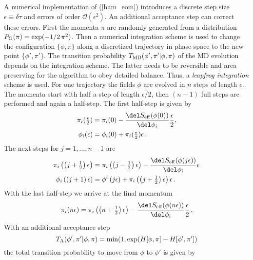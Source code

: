 A numerical implementation of (\ref{ham_eom}) introduces a discrete step size $\epsilon \equiv \delta	\tau$ and errors of order $\mathcal{O}(\epsilon^{2})$. An additional  acceptance step can correct these errors. First the momenta $\pi$ are randomly generated from a  distribution $P_{\rm G}(\pi)=\exp(-1/2\,\pi^{2})$. Then a numerical integration scheme is used to change the configuration $\lbrace \phi,\pi \rbrace$ along a discretized trajectory in phase space to the new point $\lbrace \phi',\pi' \rbrace$. The transition probability $T_{\rm MD}(\phi',\pi' \vert \phi,\pi)$ of the MD evolution depends on the integration scheme. The latter needs to be reversible and area preserving for the algorithm to obey detailed balance. Thus, a \textit{leapfrog integration} scheme  is used. For one trajectory the fields $\phi$ are evolved in $n$ steps of length $\epsilon$. The momenta start with half a step of length $\epsilon / 2$, then $(n-1)$ full steps are performed and again a half-step. The first half-step is given by
%
%
\begin{align}
\pi_{i}(\tfrac{\epsilon}{2}) &= \pi_{i}(0) - \frac{\del S_{\rm eff}(\phi(0))}{\del \phi_{i}}\frac{\epsilon}{2}, \notag \\
\phi_{i}(\epsilon) &= \phi_{i}(0) + \pi_{i}(\tfrac{\epsilon}{2}) \epsilon\, .
\end{align}
%
%
The next steps for $j=1,\ldots,n-1$ are
%
%
\begin{align}
\pi_{i}\left(\left(j+\tfrac{1}{2}\right)\epsilon\right) &= \pi_{i}\left(\left(j-\tfrac{1}{2}\right)\epsilon\right) - \frac{\del S_{\rm eff}(\phi(j\epsilon))}{\del \phi_{i}}\epsilon \notag \\
\phi_{i}\left(\left(j+1\right)\epsilon\right) &= \phi^{i}\left(j\epsilon\right) + \pi_{i}\left(\left(j+\tfrac{1}{2}\right)\epsilon\right) \epsilon\, .
\end{align}
%
%
With the last half-step we arrive at the final momentum
%
%
\begin{equation}
\pi_{i}(n\epsilon) = \pi_{i}\left(\left(n+\tfrac{1}{2}\right)\epsilon\right) - \frac{\del S_{\rm eff}(\phi(n\epsilon))}{\del \phi_{i}}\frac{\epsilon}{2}\, .
\end{equation}
%
%
With an additional  acceptance step
%
%
\begin{equation}
T_{\rm A}(\phi',\pi' \vert \phi,\pi) = \min(1, \exp ( H[\phi,\pi] - H[\phi',\pi'] )
\end{equation}
%
%
the total transition probability to move from $\phi$ to $\phi'$ is given by
